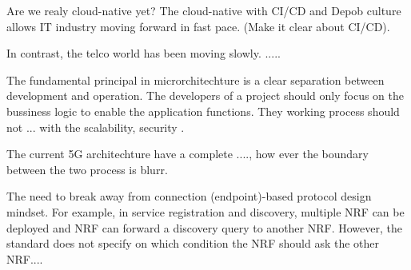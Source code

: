 \documentclass[a4paper]{article}
\begin{document}
\begin{comment}
5G networks are poised to deliver high bandwidth, low latency, and faster performance—both driving and enabling application innovation and new business models. To deliver cost-effective 5G performance, service providers are taking advantage of the microservices-based, cloud-native containerized architecture already in use by enterprises. These new solutions give service providers the ability to dynamically place workloads within a network and build out their MEC platform to support the next generation of applications.

Leading-edge solutions from F5 help service providers deliver new 5G functionality while maintaining their existing 4G core networks. F5 BIG-IP Next Service Proxy for Kubernetes (SPK) and F5 Carrier-Grade Aspen Mesh enable service providers to maintain real-time application visibility, scale to meet demand, and increase traffic visibility and security. F5 N6 LAN solutions help service providers deliver network functions, reducing cost and improving performance. These solutions work in conjunction with F5 security solutions designed to protect networks from new attack vectors and threats. With the right solutions in place, service providers can take advantage of the many benefits of a cloud-native infrastructure from the core to the far edge of the network as they embark on the 5G journey. 



\end{comment}


Are we realy cloud-native yet?
The cloud-native with CI/CD and Depob culture allows IT industry moving forward in fast pace. (Make it clear about CI/CD).

In contrast, the telco world has been moving slowly. .....



The fundamental principal in microrchitechture is a clear separation between development and operation. The developers of a project should only focus on the bussiness logic to enable the application functions. They working process should not ... with the scalability, security .

The current 5G architechture have a complete ...., how ever the boundary between the two process is blurr. 

The need to break away from connection (endpoint)-based protocol design mindset. For example, in service registration and discovery, multiple NRF can be deployed and NRF can forward a discovery query to another NRF. However, the standard does not specify on which condition the NRF should ask the other NRF....
\end{document}
